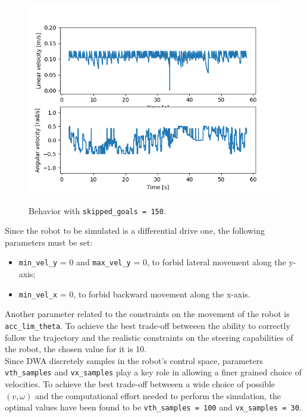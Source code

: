 \documentclass[11pt,a4paper]{article}
\begin{document}
\begin{figure}[H]
{        \includegraphics[scale=0.35]{different_params/dwa_skippedgoals150/Linear_and_Angular_Velocities.png}
    }
    \caption[]{Behavior with \texttt{skipped\_goals = 150}.}
\end{figure}

Since the robot to be simulated is a differential drive one, the following parameters must be set:
\begin{itemize}
    \item \texttt{min\_vel\_y} = 0 and \texttt{max\_vel\_y} = 0, to forbid lateral movement along the y-axis;
    \item \texttt{min\_vel\_x} = 0, to forbid backward movement along the x-axis.\\
\end{itemize}

Another parameter related to the constraints on the movement of the robot is \texttt{acc\_lim\_theta}.
To achieve the best trade-off betweeen the ability to correctly follow the trajectory and the realistic
constraints on the steering capabilities of the robot, the chosen value for it is 10.\\

Since DWA discretely samples in the robot's control space, parameters \texttt{vth\_samples}
and \texttt{vx\_samples} play a key role in allowing a finer grained choice of velocities.
To achieve the best trade-off betweeen a wide choice of possible $(v,\omega)$ and the computational effort
needed to perform the simulation, the optimal values have been found to be \texttt{vth\_samples = 100}
and \texttt{vx\_samples = 30}.\\
\end{document}

